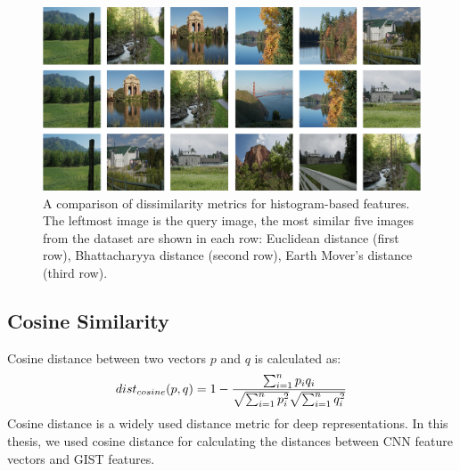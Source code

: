 \begin{figure} 
\centering
\includegraphics[width=\textwidth]{figures/chapter2/16sims.png}
\vspace{10pt}
\caption{A comparison of dissimilarity metrics for histogram-based features. The leftmost image is the query image, the most similar five images from the dataset are shown in each row: Euclidean distance (first row), Bhattacharyya distance (second row), Earth Mover’s distance (third row).}
\label{fig:sim_comp}
\end{figure}

\subsection{Cosine Similarity}
Cosine distance between two vectors $p$ and $q$ is calculated as:
\begin{equation}
dist_{cosine}(p,q) = 1 - {{\sum_{i=1}^{n}p_{i}q_{i}} \over {\sqrt{\sum_{i=1}^{n}p_{i}^2}} \sqrt{\sum_{i=1}^{n}q_{i}^2}} 
\end{equation}
Cosine distance is a widely used distance metric for deep representations. In this thesis, we used cosine distance for calculating the distances between CNN feature vectors and GIST features.